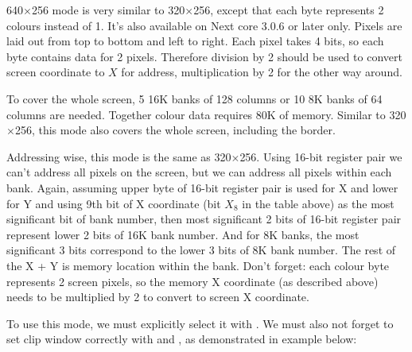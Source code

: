640$\times$256 mode is very similar to 320$\times$256, except that each byte represents 2 colours instead of 1. It's also available on Next core 3.0.6 or later only. Pixels are laid out from top to bottom and left to right. Each pixel takes 4 bits, so each byte contains data for 2 pixels. Therefore division by 2 should be used to convert screen coordinate to $X$ for address, multiplication by 2 for the other way around.

To cover the whole screen, 5 16K banks of 128 columns or 10 8K banks of 64 columns are needed. Together colour data requires 80K of memory. Similar to 320$\times$256, this mode also covers the whole screen, including the border.

Addressing wise, this mode is the same as 320$\times$256. Using 16-bit register pair we can't address all pixels on the screen, but we can address all pixels within each bank. Again, assuming upper byte of 16-bit register pair is used for X and lower for Y and using 9th bit of X coordinate (bit $X_8$ in the table above) as the most significant bit of bank number, then most significant 2 bits of 16-bit register pair represent lower 2 bits of 16K bank number. And for 8K banks, the most significant 3 bits correspond to the lower 3 bits of 8K bank number. The rest of the X + Y is memory location within the bank. Don't forget: each colour byte represents 2 screen pixels, so the memory X coordinate (as described above) needs to be multiplied by 2 to convert to screen X coordinate.

To use this mode, we must explicitly select it with . We must also not forget to set clip window correctly with  and , as demonstrated in example below:

